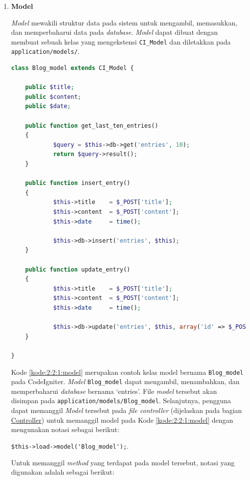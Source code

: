 \documentclass[a4paper,twoside]{article}
\begin{document}
\begin{enumerate}
\begin{itemize}
		            \begin{enumerate}
			            \item \textbf{Model}
			                  \label{sub:2:2:1:model}

			                  \textit{Model} mewakili struktur data pada sistem untuk mengambil, memasukkan, dan memperbaharui data pada \textit{database}. \textit{Model} dapat dibuat dengan membuat sebuah kelas yang mengekstensi \verb|CI_Model| dan diletakkan pada \verb|application/models/|.

			                  \begin{lstlisting}[language=php, caption=Contoh \textit{model}, label=kode:2:2:1:model]
class Blog_model extends CI_Model {

	public $title;
	public $content;
	public $date;

	public function get_last_ten_entries()
	{
			$query = $this->db->get('entries', 10);
			return $query->result();
	}

	public function insert_entry()
	{
			$this->title    = $_POST['title'];
			$this->content  = $_POST['content'];
			$this->date     = time();

			$this->db->insert('entries', $this);
	}

	public function update_entry()
	{
			$this->title    = $_POST['title'];
			$this->content  = $_POST['content'];
			$this->date     = time();

			$this->db->update('entries', $this, array('id' => $_POST['id']));
	}

}
\end{lstlisting}

			                  Kode \ref{kode:2:2:1:model} merupakan contoh kelas model bernama \verb|Blog_model| pada CodeIgniter. \textit{Model} \verb|Blog_model| dapat mengambil, menambahkan, dan memperbaharui \textit{database} bernama `entries'. File \textit{model} tersebut akan disimpan pada \verb|application/models/Blog_model|. Selanjutnya, pengguna dapat memanggil \textit{Model} tersebut pada \textit{file controller} (dijelaskan pada bagian \hyperref[sub:2:2:3:Controller]{Controller}) untuk memanggil model pada Kode \ref{kode:2:2:1:model} dengan mengunakan notasi sebagai \mbox{berikut}:

			                  \begin{center}
				                  \verb|$this->load->model('Blog_model');|.
			                  \end{center}

			                  Untuk memanggil \textit{method} yang terdapat pada model tersebut, notasi yang digunakan adalah sebagai berikut:


\end{enumerate}
\end{itemize}
\end{enumerate}
\end{document}
